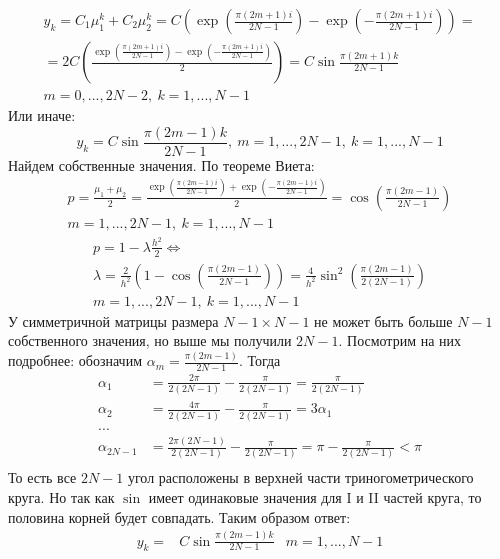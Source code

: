 \documentclass[12pt]{article}
\begin{document}
\begin{enumerate}
\begin{enumerate}
\begin{multline*}
            y_k=C_1\mu_1^k+C_2\mu_2^k=C\left(\exp\left(\frac{\pi(2m+1)i}{2N-1}\right)-\exp\left(-\frac{\pi(2m+1)i}{2N-1}\right)\right)=\\
            =2C\left(\frac{\exp\left(\frac{\pi(2m+1)i}{2N-1}\right)-\exp\left(-\frac{\pi(2m+1)i}{2N-1}\right)}{2}\right) = C\sin\frac{\pi(2m+1)k}{2N-1}\\
            m=0,...,2N-2,\ k=1,...,N-1
        \end{multline*}
        Или иначе:
        \[y_k=C\sin\frac{\pi(2m-1)k}{2N-1},\ m=1,...,2N-1,\ k=1,...,N-1\]
        Найдем собственные значения. По теореме Виета:
        \begin{multline*}
            p=\frac{\mu_1+\mu_2}{2}=\frac{\exp\left(\frac{\pi(2m-1)i}{2N-1}\right) + \exp\left(-\frac{\pi(2m-1)i}{2N-1}\right)}{2}=\cos\left(\frac{\pi(2m-1)}{2N-1}\right)\\
            m=1,...,2N-1,\ k=1,...,N-1
        \end{multline*}
        \begin{multline*}
            p=1-\lambda\frac{h^2}{2}\Leftrightarrow\\\lambda=\frac{2}{h^2}\left(1-\cos\left(\frac{\pi(2m-1)}{2N-1}\right)\right)=\frac{4}{h^2}\sin^2\left(\frac{\pi(2m-1)}{2(2N-1)}\right)\\
            m=1,...,2N-1,\ k=1,...,N-1
        \end{multline*}
        У симметричной матрицы размера $N-1\times N-1$ не может быть больше $N-1$ собственного значения, но выше мы получили $2N-1$.
        Посмотрим на них подробнее: обозначим $\alpha_m=\frac{\pi(2m-1)}{2N-1}$. Тогда
        \begin{align*}
            \alpha_1 &= \frac{2\pi}{2(2N-1)} - \frac{\pi}{2(2N-1)} = \frac{\pi}{2(2N-1)} \\
            \alpha_2 &= \frac{4\pi}{2(2N-1)} - \frac{\pi}{2(2N-1)} = 3\alpha_1 \\
            ...& \\
            \alpha_{2N-1} &= \frac{2\pi(2N-1)}{2(2N-1)} - \frac{\pi}{2(2N-1)} = \pi - \frac{\pi}{2(2N-1)} < \pi \\
        \end{align*}
        То есть все $2N-1$ угол расположены в верхней части триногометрического круга.
        Но так как $\sin$ имеет одинаковые значения для I и II частей круга,
        то половина корней будет совпадать. Таким образом ответ:
        \begin{align*}
            y_k=&C\sin\frac{\pi(2m-1)k}{2N-1}  &m=1,...,N-1\\

\end{align*}
\end{enumerate}
\end{enumerate}
\end{document}
